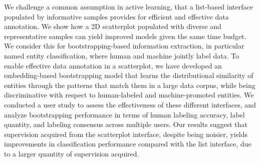 We challenge a common assumption in active learning, that a list-based interface populated by informative samples provides for efficient and effective data annotation. We show how a 2D scatterplot populated with diverse and representative samples can yield improved models given the same time budget. We consider this for bootstrapping-based information extraction, in particular named entity classification, where human and machine jointly label data. To enable effective data annotation in a scatterplot, we have developed an embedding-based bootstrapping model that learns the distributional similarity of entities through the patterns that match them in a large data corpus, while being discriminative with respect to human-labeled and machine-promoted entities. We conducted a user study to assess the effectiveness of these different interfaces, and analyze bootstrapping performance in terms of human labeling accuracy, label quantity, and labeling consensus across multiple users. Our results suggest that supervision acquired from the scatterplot interface, despite being noisier, yields improvements in classification performance compared with the list interface, due to a larger quantity of supervision acquired.
